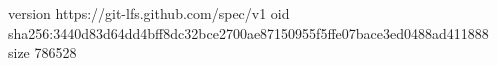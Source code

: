 version https://git-lfs.github.com/spec/v1
oid sha256:3440d83d64dd4bff8dc32bce2700ae87150955f5ffe07bace3ed0488ad411888
size 786528
